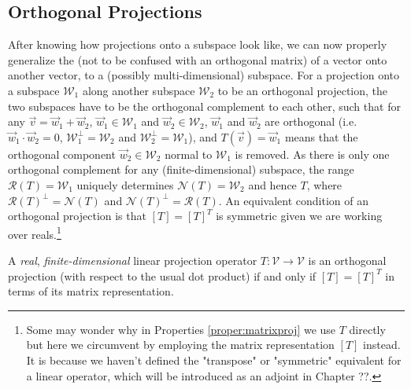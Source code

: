 \subsection{Orthogonal Projections}

After knowing how projections onto a subspace look like, we can now properly generalize the  (not to be confused with an orthogonal matrix) of a vector onto another vector, to a (possibly multi-dimensional) subspace. For a projection onto a subspace $\mathcal{W}_1$ along another subspace $\mathcal{W}_2$ to be an orthogonal projection, the two subspaces have to be the orthogonal complement to each other, such that for any $\vec{v} = \vec{w}_1 + \vec{w}_2$, $\vec{w}_1 \in \mathcal{W}_1$ and $\vec{w}_2 \in \mathcal{W}_2$, $\vec{w}_1$ and $\vec{w}_2$ are orthogonal (i.e.\ $\vec{w}_1 \cdot \vec{w}_2 = 0$, $\mathcal{W}_1^\perp = \mathcal{W}_2$ and $\mathcal{W}_2^\perp = \mathcal{W}_1$), and $T(\vec{v}) = \vec{w}_1$ means that the orthogonal component $\vec{w}_2 \in \mathcal{W}_2$ normal to $\mathcal{W}_1$ is removed. As there is only one orthogonal complement for any (finite-dimensional) subspace, the range $\mathcal{R}(T) = \mathcal{W}_1$ uniquely determines $\mathcal{N}(T) = \mathcal{W}_2$ and hence $T$, where $\mathcal{R}(T)^\perp = \mathcal{N}(T)$ and $\mathcal{N}(T)^\perp = \mathcal{R}(T)$. An equivalent condition of an orthogonal projection is that $[T] = [T]^T$ is symmetric given we are working over reals.\footnote{Some may wonder why in Properties \ref{proper:matrixproj} we use $T$ directly but here we circumvent by employing the matrix representation $[T]$ instead. It is because we haven't defined the "transpose" or "symmetric" equivalent for a linear operator, which will be introduced as an adjoint in Chapter ??.}
\begin{proper}
A \textit{real}, \textit{finite-dimensional} linear projection operator $T: \mathcal{V} \to \mathcal{V}$ is an orthogonal projection (with respect to the usual dot product) if and only if $[T] = [T]^T$ in terms of its matrix representation.  
\end{proper}
